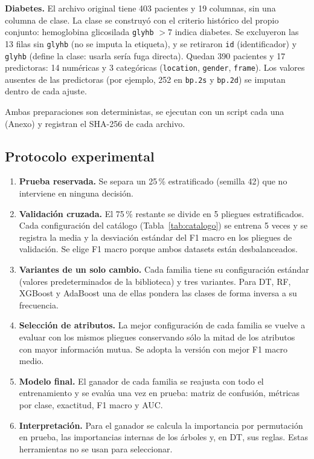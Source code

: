 \documentclass[11pt]{article}
\begin{document}
\textbf{Diabetes.} El archivo original \cite{datosdiabetes} tiene 403 pacientes y 19
columnas, sin una columna de clase. La clase se construyó con el criterio histórico del
propio conjunto: hemoglobina glicosilada \texttt{glyhb} $>7$ indica diabetes. Se
excluyeron las 13 filas sin \texttt{glyhb} (no se imputa la etiqueta), y se retiraron
\texttt{id} (identificador) y \texttt{glyhb} (define la clase: usarla sería fuga
directa). Quedan 390 pacientes y 17 predictoras: 14 numéricas y 3 categóricas
(\texttt{location}, \texttt{gender}, \texttt{frame}). Los valores ausentes de las
predictoras (por ejemplo, 252 en \texttt{bp.2s} y \texttt{bp.2d}) se imputan dentro de
cada ajuste.

Ambas preparaciones son deterministas, se ejecutan con un script cada una (Anexo) y
registran el SHA-256 de cada archivo.

\subsection{Protocolo experimental}
\begin{enumerate}
\item \textbf{Prueba reservada.} Se separa un 25\,\% estratificado (semilla 42) que no
interviene en ninguna decisión.
\item \textbf{Validación cruzada.} El 75\,\% restante se divide en 5 pliegues
estratificados. Cada configuración del catálogo (Tabla~\ref{tab:catalogo}) se entrena
5 veces y se registra la media y la desviación estándar del F1 macro en los pliegues
de validación. Se elige F1 macro porque ambos datasets están desbalanceados.
\item \textbf{Variantes de un solo cambio.} Cada familia tiene su configuración estándar
(valores predeterminados de la biblioteca) y tres variantes. Para DT, RF, XGBoost y
AdaBoost una de ellas pondera las clases de forma inversa a su frecuencia.
\item \textbf{Selección de atributos.} La mejor configuración de cada familia se vuelve a
evaluar con los mismos pliegues conservando sólo la mitad de los atributos con mayor
información mutua. Se adopta la versión con mejor F1 macro medio.
\item \textbf{Modelo final.} El ganador de cada familia se reajusta con todo el
entrenamiento y se evalúa una vez en prueba: matriz de confusión, métricas por clase,
exactitud, F1 macro y AUC.
\item \textbf{Interpretación.} Para el ganador se calcula la importancia por permutación
en prueba, las importancias internas de los árboles y, en DT, sus reglas. Estas
herramientas no se usan para seleccionar.
\end{enumerate}
\end{document}
